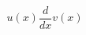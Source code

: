 \documentclass[preview]{standalone}
\begin{document}
\begin{align*}
u(x)\dfrac{d}{dx}v(x)
\end{align*}
\end{document}
